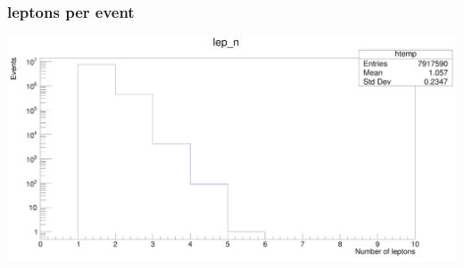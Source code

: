 \documentclass[12pt, a4paper, bibliography=totoc]{scrartcl}
\begin{document}
\begin{multicols}{2}
\subsubsection{leptons per event}

\begin{center}
	\includegraphics[width=\linewidth]{fig/number_produced_leptons.png}
	\label{lep_n}
\end{center}


\end{multicols}
\end{document}
